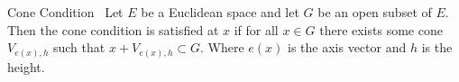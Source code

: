 \begin{defn}{Cone Condition}~\label{def:cone_condition}
    Let $E$ be a Euclidean space and let $G$ be an open subset of $E$. Then the cone condition is satisfied at $x$ if for all $x\in G$ there exists some cone $V_{e(x),h}$ such that $x+V_{e(x),h}\subset G$.
    Where $e(x)$ is the axis vector and $h$ is the height. 
\end{defn}

